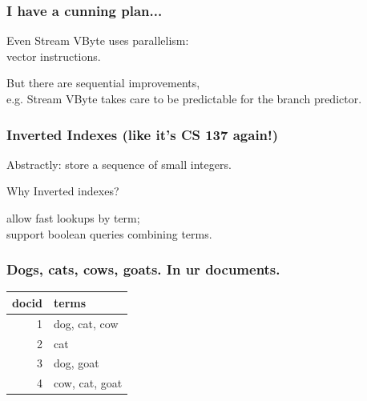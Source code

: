 \begin{frame}
\frametitle{I have a cunning plan...}

\Large
\begin{changemargin}{2cm}
Even Stream VByte uses parallelism:\\
\hspace*{2em}vector instructions. 

But there
are sequential improvements, \\
e.g. Stream VByte takes care to be predictable
for the branch predictor.
\end{changemargin}

\end{frame}
\begin{frame}
\frametitle{Inverted Indexes (like it's CS 137 again!)}

\Large
\begin{changemargin}{1cm}
\vspace*{-1em}
Abstractly: store a sequence of small integers.


Why Inverted indexes?

\hspace*{1cm}allow fast lookups by term;\\
\hspace*{1cm}support boolean queries combining terms.

\end{changemargin}

\end{frame}
\begin{frame}
\frametitle{Dogs, cats, cows, goats. In ur documents.}
\Large
\begin{changemargin}{2cm}
\begin{center}
\begin{tabular}{r|l}
docid & terms \\ \hline
1 & dog, cat, cow\\
2 & cat\\
3 & dog, goat\\
4 & cow, cat, goat\\
\end{tabular}
\end{center}
\end{changemargin}

\end{frame}


